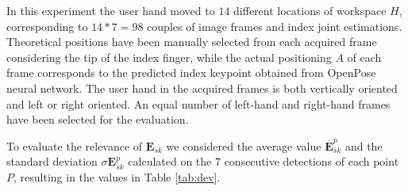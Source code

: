 \documentclass[a4paper, 10 pt, conference]{ieeeconf}      %
\begin{document}
In this experiment the user hand moved to $14$ different locations of workspace $H$, corresponding to $14 * 7 = 98$ couples of image frames and index joint estimations. Theoretical positions have been manually selected from each acquired frame considering the tip of the index finger, while the actual positioning $A$ of each frame corresponds to the predicted index keypoint obtained from OpenPose neural network. The user hand in the acquired frames is both vertically oriented and left or right oriented. An equal number of left-hand and right-hand frames have been selected for the evaluation.

To evaluate the relevance of $\mathbf{E}_{sk}$ we considered the average value $\overline{\mathbf{E}}^p_{sk}$ and the standard deviation $\sigma{\mathbf{E}}^p_{sk}$ calculated on the $7$ consecutive detections of each point $P$, resulting in the values in Table \ref{tab:dev}.
\end{document}
